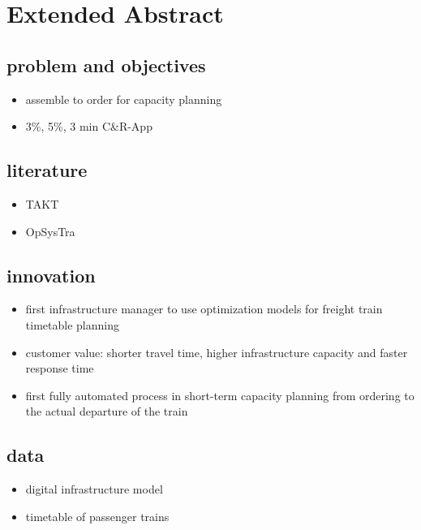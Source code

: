 \section{Extended Abstract}
\label{chap:extAbs}

\subsection{problem and objectives}
\begin{itemize}
  \item assemble to order for capacity planning
  \item 3\%, 5\%, 3 min C\&R-App
\end{itemize}

\subsection{literature}
\begin{itemize}
  \item TAKT
  \item OpSysTra
\end{itemize}

\subsection{innovation}
\begin{itemize}
  \item first infrastructure manager to use optimization models for freight train timetable planning
  \item customer value: shorter travel time, higher infrastructure capacity and faster response time
  \item first fully automated process in short-term capacity planning from ordering to the actual departure of the train
\end{itemize}

\subsection{data}
\begin{itemize}
  \item digital infrastructure model
  \item timetable of passenger trains
\end{itemize}

